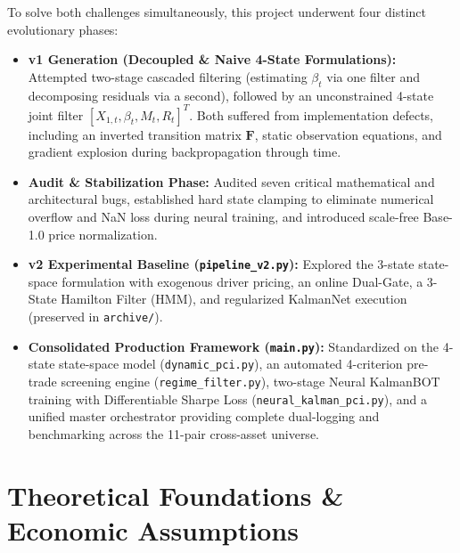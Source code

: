 \documentclass[11pt, a4paper]{article}
\begin{document}
To solve both challenges simultaneously, this project underwent four distinct evolutionary phases:
\begin{itemize}
    \item \textbf{v1 Generation (Decoupled \& Naive 4-State Formulations):} Attempted two-stage cascaded filtering (estimating $\beta_t$ via one filter and decomposing residuals via a second), followed by an unconstrained 4-state joint filter $[X_{1,t}, \beta_t, M_t, R_t]^T$. Both suffered from implementation defects, including an inverted transition matrix $\mathbf{F}$, static observation equations, and gradient explosion during backpropagation through time.
    \item \textbf{Audit \& Stabilization Phase:} Audited seven critical mathematical and architectural bugs, established hard state clamping to eliminate numerical overflow and NaN loss during neural training, and introduced scale-free Base-1.0 price normalization.
    \item \textbf{v2 Experimental Baseline (\texttt{pipeline\_v2.py}):} Explored the 3-state state-space formulation with exogenous driver pricing, an online Dual-Gate, a 3-State Hamilton Filter (HMM), and regularized KalmanNet execution (preserved in \texttt{archive/}).
    \item \textbf{Consolidated Production Framework (\texttt{main.py}):} Standardized on the 4-state state-space model (\texttt{dynamic\_pci.py}), an automated 4-criterion pre-trade screening engine (\texttt{regime\_filter.py}), two-stage Neural KalmanBOT training with Differentiable Sharpe Loss (\texttt{neural\_kalman\_pci.py}), and a unified master orchestrator providing complete dual-logging and benchmarking across the 11-pair cross-asset universe.
\end{itemize}

\section{Theoretical Foundations \& Economic Assumptions}
\end{document}
